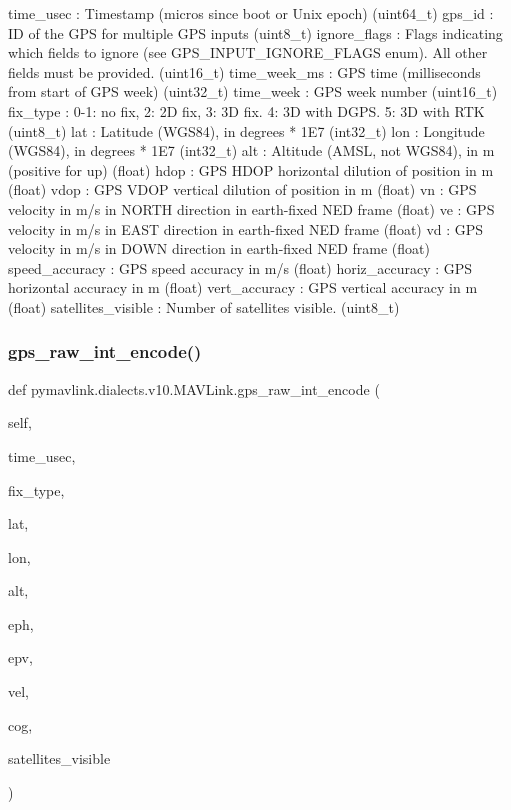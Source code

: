 \begin{DoxyVerb}
\begin{DoxyVerb}
\begin{DoxyVerb}
time_usec                 : Timestamp (micros since boot or Unix epoch) (uint64_t)
gps_id                    : ID of the GPS for multiple GPS inputs (uint8_t)
ignore_flags              : Flags indicating which fields to ignore (see GPS_INPUT_IGNORE_FLAGS enum).  All other fields must be provided. (uint16_t)
time_week_ms              : GPS time (milliseconds from start of GPS week) (uint32_t)
time_week                 : GPS week number (uint16_t)
fix_type                  : 0-1: no fix, 2: 2D fix, 3: 3D fix. 4: 3D with DGPS. 5: 3D with RTK (uint8_t)
lat                       : Latitude (WGS84), in degrees * 1E7 (int32_t)
lon                       : Longitude (WGS84), in degrees * 1E7 (int32_t)
alt                       : Altitude (AMSL, not WGS84), in m (positive for up) (float)
hdop                      : GPS HDOP horizontal dilution of position in m (float)
vdop                      : GPS VDOP vertical dilution of position in m (float)
vn                        : GPS velocity in m/s in NORTH direction in earth-fixed NED frame (float)
ve                        : GPS velocity in m/s in EAST direction in earth-fixed NED frame (float)
vd                        : GPS velocity in m/s in DOWN direction in earth-fixed NED frame (float)
speed_accuracy            : GPS speed accuracy in m/s (float)
horiz_accuracy            : GPS horizontal accuracy in m (float)
vert_accuracy             : GPS vertical accuracy in m (float)
satellites_visible        : Number of satellites visible. (uint8_t)\end{DoxyVerb}
 \mbox{\label{classpymavlink_1_1dialects_1_1v10_1_1MAVLink_a9a6a6ffb325e3fcdeaeb6a962b310388}} 
\subsubsection{\texorpdfstring{gps\+\_\+raw\+\_\+int\+\_\+encode()}{gps\_raw\_int\_encode()}}
{\footnotesize\ttfamily def pymavlink.\+dialects.\+v10.\+M\+A\+V\+Link.\+gps\+\_\+raw\+\_\+int\+\_\+encode (\begin{DoxyParamCaption}\item[{}]{self,  }\item[{}]{time\+\_\+usec,  }\item[{}]{fix\+\_\+type,  }\item[{}]{lat,  }\item[{}]{lon,  }\item[{}]{alt,  }\item[{}]{eph,  }\item[{}]{epv,  }\item[{}]{vel,  }\item[{}]{cog,  }\item[{}]{satellites\+\_\+visible }\end{DoxyParamCaption})}


\end{DoxyVerb}
\end{DoxyVerb}
